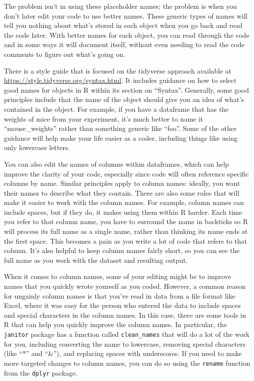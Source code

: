 \documentclass[]{tufte-book}
\begin{document}
The problem isn't in using these placeholder names; the problem is when you
don't later edit your code to use better names. These generic types of names
will tell you nothing about what's stored in each object when you go back
and read the code later. With better names for each object, you can read through
the code and in some ways it will document itself, without even needing to
read the code comments to figure out what's going on.

There is a style guide that is focused on the tidyverse approach available
at \url{https://style.tidyverse.org/syntax.html}. It includes guidance on how to
select good names for objects in R within its section on ``Syntax''. Generally,
some good principles include that the name of the object should give you an
idea of what's contained in the object. For example, if you have a dataframe
that has the weights of mice from your experiment, it's much better to name
it ``mouse\_weights'' rather than something generic like ``foo''. Some of the
other guidance will help make your life easier as a coder, including things
like using only lowercase letters.

You can also edit the names of columns within dataframes, which can help improve
the clarity of your code, especially since code will often reference specific
columns by name. Similar principles apply to column names: ideally, you want
their names to describe what they contain. There are also some rules that will
make it easier to work with the column names. For example, column names can
include spaces, but if they do, it makes using them within R harder. Each time
you refer to that column name, you have to surround the name in backticks so R
will process its full name as a single name, rather than thinking its name ends
at the first space. This becomes a pain as you write a lot of code that refers
to that column. It's also helpful to keep column names fairly short, so you can
see the full name as you work with the dataset and resulting output.

When it comes to column names, some of your editing might be to improve names
that you quickly wrote yourself as you coded. However, a common reason for
ungainly column names is that you've read in data from a file format like Excel,
where it was easy for the person who entered the data to include spaces and
special characters in the column names. In this case, there are some tools in
R that can help you quickly improve the column names. In particular, the
\texttt{janitor} package has a function called \texttt{clean\_names} that will do a lot of the
work for you, including converting the name to lowercase, removing special
characters (like ``*'' and ``\&''), and replacing spaces with underscores. If you
need to make more targeted changes to column names, you can do so using the
\texttt{rename} function from the \texttt{dplyr} package.
\end{document}

